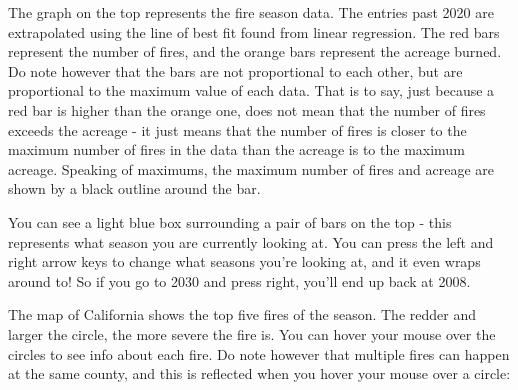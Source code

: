 \documentclass[fontsize=11pt]{article}
\begin{document}
The graph on the top represents the fire season data. The entries past 2020 are extrapolated using the line of best fit found from linear regression. The red bars represent the number of fires, and the orange bars represent the acreage burned. Do note however that the bars are not proportional to each other, but are proportional to the maximum value of each data. That is to say, just because a red bar is higher than the orange one, does not mean that the number of fires exceeds the acreage - it just means that the number of fires is closer to the maximum number of fires in the data than the acreage is to the maximum acreage. Speaking of maximums, the maximum number of fires and acreage are shown by a black outline around the bar.

You can see a light blue box surrounding a pair of bars on the top - this represents what season you are currently looking at. You can press the left and right arrow keys to change what seasons you're looking at, and it even wraps around to! So if you go to 2030 and press right, you'll end up back at 2008.

The map of California shows the top five fires of the season. The redder and larger the circle, the more severe the fire is. You can hover your mouse over the circles to see info about each fire. Do note however that multiple fires can happen at the same county, and this is reflected when you hover your mouse over a circle:
\end{document}
